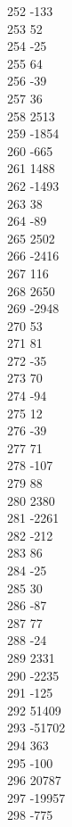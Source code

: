 { 252	-133 \\
 253	52 \\
 254	-25 \\
 255	64 \\
 256	-39 \\
 257	36 \\
 258	2513 \\
 259	-1854 \\
 260	-665 \\
 261	1488 \\
 262	-1493 \\
 263	38 \\
 264	-89 \\
 265	2502 \\
 266	-2416 \\
 267	116 \\
 268	2650 \\
 269	-2948 \\
 270	53 \\
 271	81 \\
 272	-35 \\
 273	70 \\
 274	-94 \\
 275	12 \\
 276	-39 \\
 277	71 \\
 278	-107 \\
 279	88 \\
 280	2380 \\
 281	-2261 \\
 282	-212 \\
 283	86 \\
 284	-25 \\
 285	30 \\
 286	-87 \\
 287	77 \\
 288	-24 \\
 289	2331 \\
 290	-2235 \\
 291	-125 \\
 292	51409 \\
 293	-51702 \\
 294	363 \\
 295	-100 \\
 296	20787 \\
 297	-19957 \\
 298	-775 \\
}
